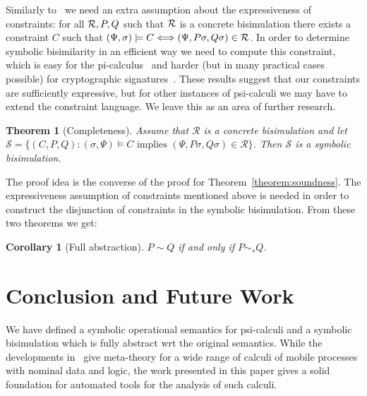 \documentclass{eptcs}
\newtheorem{theorem}[definition]{Theorem}
\newtheorem{corollary}[definition]{Corollary}
\theoremstyle{definition}
\begin{document}
Similarly to~\cite{hennessy.lin:symbolic-bisimulations} we need an extra assumption about the expressiveness of constraints: for all ${\cal R}, P, Q$ such that
$\cal R$ is a concrete bisimulation there exists a constraint $C$ such that
\((\Psi, \sigma) \models C \Longleftrightarrow (\Psi, P\sigma, Q\sigma) \in {\cal R}\).
In order to determine symbolic bisimilarity in an efficient way we
need to compute this constraint, which is easy for the
pi-calculus~\cite{boreale.de-nicola:symbolic-semantics,lin:symbolic-transition,lin:computing-bisimulations}
and harder (but in many practical cases possible) for cryptographic
signatures~\cite{borgstroem:equivalences-calculi}. These results suggest that
our constraints are sufficiently expressive, but for other instances of
psi-calculi we may have to extend the constraint language. We leave this as an
area of further research.

\begin{theorem}[Completeness]
\label{theorem:completeness}
Assume that $\mathcal{R}$ is a concrete bisimulation and let \\ $\mathcal{S} =
\{(C,P,Q) : (\sigma,\Psi) \models C \text{ implies }
(\Psi, P\sigma, Q\sigma) \in \mathcal{R}\}$. Then $\mathcal{S}$ is a symbolic
bisimulation.
\end{theorem}

The proof idea is the converse of the proof for Theorem~\ref{theorem:soundness}. The expressiveness assumption of constraints mentioned above is needed in order to construct the disjunction of constraints in the symbolic bisimulation. 
From these two theorems we get:
\begin{corollary}[Full abstraction]
$P \sim Q$ if and only if $P \sim_s Q$.
\end{corollary}

\section{Conclusion and Future Work}

\label{sec:conclusion}
We have defined a symbolic operational semantics for psi-calculi and a
symbolic bisimulation which is fully abstract wrt the original
semantics. 
While the developments
in~\cite{bengtson.johansson.ea:psi-calculi} give meta-theory for a
wide range of calculi of mobile processes with nominal data and
logic, the work presented in this paper gives a solid foundation for
automated tools for the analysis of such calculi.  
\end{document}
